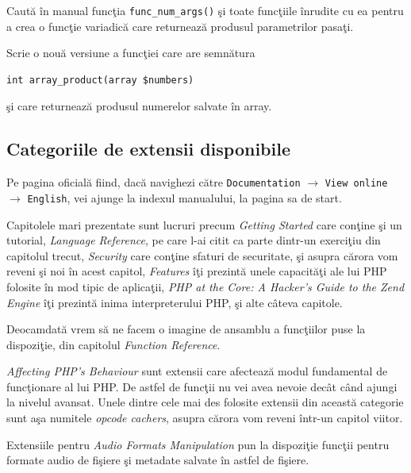 \begin{Exercise}[title={Crează o funcţie variadică}]
\ExePart
Caută în manual funcţia \texttt{func\_num\_args()} şi
toate funcţiile înrudite cu ea pentru a crea
o funcţie variadică care returnează produsul parametrilor
pasaţi.

\ExePart
Scrie o nouă versiune a funcţiei care are semnătura
\begin{verbatim}
int array_product(array $numbers)
\end{verbatim}
şi care returnează produsul numerelor salvate în array.

% 
\end{Exercise}


\subsection{Categoriile de extensii disponibile}
Pe pagina oficială fiind, dacă navighezi către
\texttt{Documentation} $\rightarrow$ \texttt{View online}
$\rightarrow$ \texttt{English},
vei ajunge la indexul
manualului, la pagina sa de start.

Capitolele mari prezentate sunt lucruri precum
\textit{Getting Started} care conţine şi un tutorial,
\textit{Language Reference}, pe care l-ai
citit ca parte dintr-un exerciţiu din capitolul trecut,
\textit{Security} care conţine sfaturi de securitate,
şi asupra cărora vom reveni şi noi
în acest capitol, \textit{Features} îţi prezintă
unele capacităţi ale lui PHP folosite
în mod tipic de aplicaţii, \textit{PHP at the Core: A Hacker's Guide to the Zend Engine}
îţi prezintă inima interpreterului PHP, şi alte câteva capitole.

Deocamdată vrem să ne facem o imagine de ansamblu a funcţiilor
puse la dispoziţie, din capitolul \textit{Function Reference}.

\textit{Affecting PHP's Behaviour} sunt extensii care afectează
modul fundamental de funcţionare al lui PHP. De astfel de funcţii
nu vei avea nevoie decât când ajungi la nivelul avansat. Unele
dintre cele mai des folosite extensii din această categorie sunt
aşa numitele \textit{opcode cachers},
asupra cărora vom reveni într-un capitol viitor.

Extensiile pentru \textit{Audio Formats Manipulation} pun
la dispoziţie funcţii pentru formate audio de fişiere şi metadate
salvate în astfel de fişiere.

